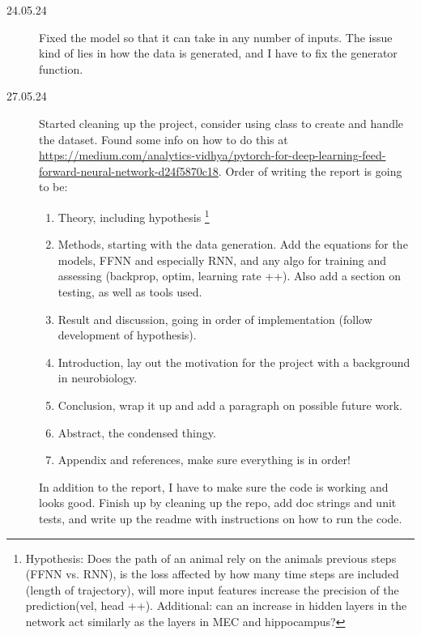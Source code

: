 \begin{description}
    \item[24.05.24] Fixed the model so that it can take in any number of inputs. The issue kind of lies in how the data is generated, and I have to fix the generator function.

    \item[27.05.24] Started cleaning up the project, consider using class to create and handle the dataset. Found some info on how to do this at \url{https://medium.com/analytics-vidhya/pytorch-for-deep-learning-feed-forward-neural-network-d24f5870c18}. Order of writing the report is going to be:
    \begin{enumerate}
        \item Theory, including hypothesis \footnote{Hypothesis: Does the path of an animal rely on the animals previous steps (FFNN vs. RNN), is the loss affected by how many time steps are included (length of trajectory), will more input features increase the precision of the prediction(vel, head ++). Additional: can an increase in hidden layers in the network act similarly as the layers in MEC and hippocampus?}
        
        \item Methods, starting with the data generation. Add the equations for the models, FFNN and especially RNN, and any algo for training and assessing (backprop, optim, learning rate ++). Also add a section on testing, as well as tools used.
        
        \item Result and discussion, going in order of implementation (follow development of hypothesis).

        \item Introduction, lay out the motivation for the project with a background in neurobiology. 

        \item Conclusion, wrap it up and add a paragraph on possible future work.

        \item Abstract, the condensed thingy.

        \item Appendix and references, make sure everything is in order!
    \end{enumerate}

    In addition to the report, I have to make sure the code is working and looks good. Finish up by cleaning up the repo, add doc strings and unit tests, and write up the readme with instructions on how to run the code.
\end{description}